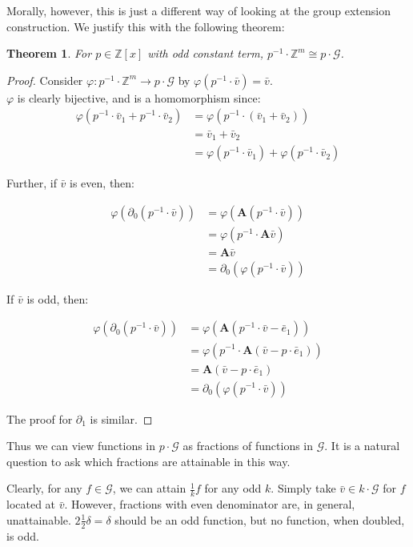 \documentclass[runningheads]{llncs}
\newcommand{\G}{\mathcal{G}}
\newcommand{\Z}{\mathbb{Z}}
\newcommand{\2}{\textbf{2}}
\newcommand{\Am}{\textbf{A}}
\newcommand{\del}{\partial}
\newcommand{\vv}{\bar{v}}
\newcommand{\e}{\bar{e}}
\newtheorem{thm}{Theorem}
\begin{document}
Morally, however, this is just a different way of looking at the group 
extension construction. We justify this with the following theorem:

\begin{thm}
  For $p \in \Z[x]$ with odd constant term, 
  $p^{-1} \cdot \Z^m \cong p \cdot \G$.
\end{thm}

\begin{proof}
  Consider $\varphi : p^{-1} \cdot \Z^m \to p \cdot \G$ by
  $\varphi(p^{-1} \cdot \vv) = \vv$.\\
  $\varphi$ is clearly bijective, and is a homomorphism since:
  \begin{align*}
       \varphi(p^{-1} \cdot \vv_1 + p^{-1} \cdot \vv_2) 
    &= \varphi(p^{-1} \cdot (\vv_1 + \vv_2))\\
    &= \vv_1 + \vv_2\\
    &= \varphi(p^{-1} \cdot \vv_1) + \varphi(p^{-1} \cdot \vv_2) 
  \end{align*}

  Further, if $\vv$ is even, then:

  \begin{align*}
       \varphi(\del_0 (p^{-1} \cdot \vv))
    &= \varphi(\Am (p^{-1} \cdot \vv))\\
    &= \varphi(p^{-1} \cdot \Am \vv)\\
    &= \Am \vv\\
    &= \del_0 (\varphi(p^{-1} \cdot \vv))
  \end{align*}

  If $\vv$ is odd, then: 

  \begin{align*}
       \varphi(\del_0 (p^{-1} \cdot \vv))
    &= \varphi(\Am (p^{-1} \cdot \vv - \e_1))\\
    &= \varphi(p^{-1} \cdot \Am (\vv - p \cdot \e_1))\\
    &= \Am (\vv - p \cdot \e_1)\\
    &= \del_0 (\varphi(p^{-1} \cdot \vv))
  \end{align*}

  The proof for $\del_1$ is similar.
\end{proof}

Thus we can view functions in $p \cdot \G$ as fractions of functions in $\G$.
It is a natural question to ask which fractions are attainable in this way.

Clearly, for any $f \in \G$, we can attain $\frac{1}{k} f$ for any odd $k$.
Simply take $\vv \in k \cdot \G$ for $f$ located at $\vv$.
However, fractions with even denominator are, in general, unattainable.
$2 \frac{1}{2}\delta = \delta$ should be an odd function,
but no function, when doubled, is odd.
\end{document}
